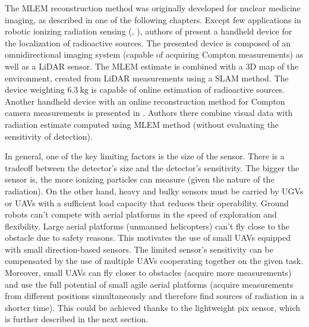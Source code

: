The \ac{MLEM} reconstruction method was originally developed for nuclear medicine imaging, as described in one of the following chapters.
Except few applications in robotic ionizing radiation sensing (\cite{fuku_compton}, \cite{3D_compton_mobile_robot_2017}), authors of \cite{handheld_mlem_reconstruction}
present a handheld device for the localization of radioactive sources. 
The presented device is composed of an omnidirectional imaging system (capable of acquiring Compton measurements) as well as a \ac{LiDAR} sensor.
The \ac{MLEM} estimate is combined with a 3D map of the environment, created from \ac{LiDAR} measurements using a \ac{SLAM} method.
The device weighting $\SI{6.3}{\kilogram}$ is capable of online estimation of radioactive sources.
Another handheld device with an online reconstruction method for Compton camera measurements is presented in \cite{handheld_visual}.
Authors there combine visual data with radiation estimate computed using \ac{MLEM} method (without evaluating the sensitivity of detection).

In general, one of the key limiting factors is the size of the sensor.
There is a tradeoff between the detector's size and the detector's sensitivity.
The bigger the sensor is, the more ionizing particles can measure (given the nature of the radiation).
On the other hand, heavy and bulky sensors must be carried by \ac{UGV}s or \ac{UAV}s with a sufficient load capacity that reduces their operability. 
Ground robots can't compete with aerial platforms in the speed of exploration and flexibility. 
Large aerial platforms (unmanned helicopters) can't fly close to the obstacle due to safety reasons.
This motivates the use of small \ac{UAV}s equipped with small direction-based sensors.
The limited sensor's sensitivity can be compensated by the use of multiple \ac{UAV}s cooperating together on the given task.
Moreover, small \ac{UAV}s can fly closer to obstacles (acquire more measurements) and use the full potential of small agile aerial platforms (acquire measurements from different positions simultaneously and therefore find sources of radiation in a shorter time).
This could be achieved thanks to the lightweight \ac{pix} \cite{baca2019timepix} sensor, which is further described in the next section.

